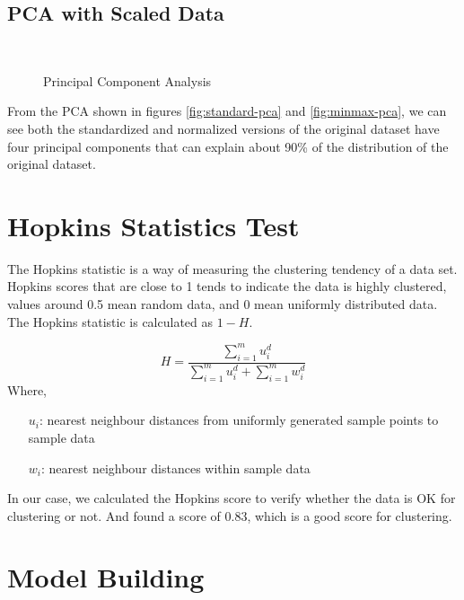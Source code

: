 \documentclass{swfuthesise}
\begin{document}
\subsection{PCA with Scaled Data}

\begin{figure}[!htp]
  \centering
  \\\bigskip
  \caption{Principal Component Analysis\label{fig:pca}}
\end{figure}

From the PCA shown in figures \ref{fig:standard-pca} and \ref{fig:minmax-pca}, we can see both the standardized and normalized versions of the original dataset have four principal components that can explain about 90\% of the distribution of the original dataset.

\section{Hopkins Statistics Test}

The Hopkins statistic is a way of measuring the clustering tendency of a data set. Hopkins
scores that are close to 1 tends to indicate the data is highly clustered, values around
0.5 mean random data, and 0 mean uniformly distributed data. The Hopkins statistic is
calculated as \(1-H\).

\[
    H=\frac{\sum_{i=1}^m{u_i^d}}{\sum_{i=1}^m{u_i^d}+\sum_{i=1}^m{w_i^d}}
\]
Where,
\begin{itemize}[itemsep=-1.5ex]
\item[\(u_i\):] nearest neighbour distances from uniformly generated sample points to
  sample data
\item[\(w_i\):] nearest neighbour distances within sample data
\end{itemize}
In our case, we calculated the Hopkins score to verify whether the data is OK for clustering or not. And found a score of 0.83, which is a good score for clustering.

\section{Model Building}
\label{sec:mod}
\end{document}
